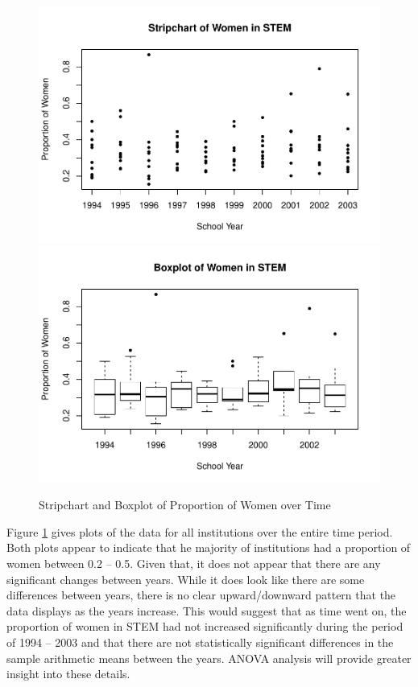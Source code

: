 \documentclass[]{article}
\begin{document}
\begin{figure}
\includegraphics[width=.49\linewidth]{Stat_461_Final_Project_Report_files/figure-latex/strip-1} \includegraphics[width=.49\linewidth]{Stat_461_Final_Project_Report_files/figure-latex/strip-2} \caption{Stripchart and Boxplot of Proportion of Women over Time}\label{fig:strip}
\end{figure}

Figure \ref{fig:strip} gives plots of the data for all institutions over
the entire time period. Both plots appear to indicate that he majority
of institutions had a proportion of women between 0.2 -- 0.5. Given
that, it does not appear that there are any significant changes between
years. While it does look like there are some differences between years,
there is no clear upward/downward pattern that the data displays as the
years increase. This would suggest that as time went on, the proportion
of women in STEM had not increased significantly during the period of
1994 -- 2003 and that there are not statistically significant
differences in the sample arithmetic means between the years. ANOVA
analysis will provide greater insight into these details.
\end{document}
